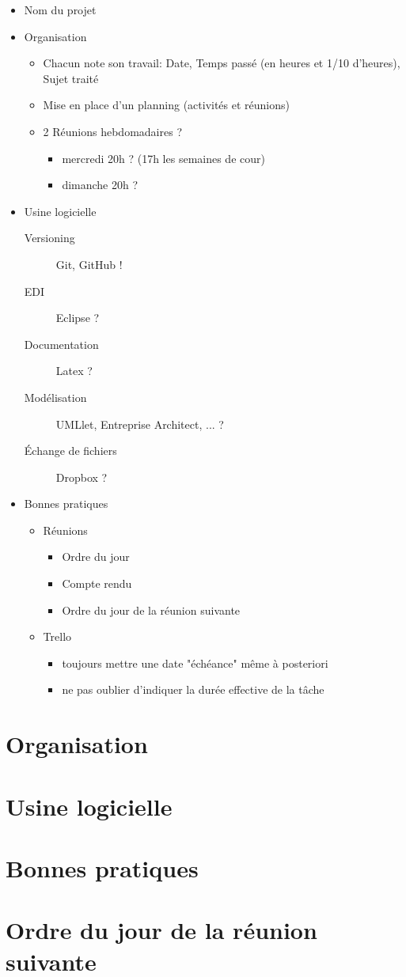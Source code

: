 \documentclass[11pt,a4paper,french,twoside,openright]{article}
\begin{document}
\begin{itemize}
\item Nom du projet
\item Organisation
  \begin{itemize}
  \item Chacun note son travail: Date, Temps passé (en heures et 1/10 d'heures), Sujet traité
  \item Mise en place d'un planning (activités et réunions)
  \item 2 Réunions hebdomadaires ?
    \begin{itemize}
    \item mercredi 20h ? (17h les semaines de cour)
    \item dimanche 20h ?
    \end{itemize}
  \end{itemize}
\item Usine logicielle
  \begin{description}
  \item[Versioning] Git, GitHub !
  \item[EDI] Eclipse ?
  \item[Documentation] Latex ?
  \item[Modélisation] UMLlet, Entreprise Architect, ... ?
  \item[Échange de fichiers] Dropbox ?
  \end{description}
\item Bonnes pratiques
  \begin{itemize}
  \item Réunions
    \begin{itemize}
    \item Ordre du jour
    \item Compte rendu
    \item Ordre du jour de la réunion suivante
    \end{itemize}
  \item Trello
    \begin{itemize}
    \item toujours mettre une date "échéance" même à posteriori
    \item ne pas oublier d'indiquer la durée effective de la tâche
    \end{itemize}
  \end{itemize}
\end{itemize}

\section{Organisation}

\section{Usine logicielle}

\section{Bonnes pratiques}

\section{Ordre du jour de la réunion suivante}

\label{LastPage}
\end{document}

